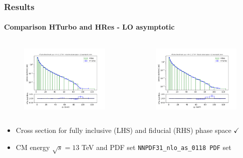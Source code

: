 \documentclass[aspectratio=43]{beamer}
\begin{document}
\begin{frame}
	
	\frametitle{Results}
	\framesubtitle{Comparison HTurbo and HRes - LO asymptotic}
	
	\footnotesize
	
	\begin{columns}
		
		
		\begin{figure}
			\includegraphics[width = 7cm]{plots/part3/chapter6/nlo-ct-1.png}
		\end{figure}
		
		
		\begin{figure}
			\includegraphics[width = 7cm]{plots/part3/chapter6/nlo-ct-fid-1.png}
		\end{figure}
		
	\end{columns}
	
	\begin{itemize}
		\item Cross section for fully inclusive (LHS) and fiducial (RHS) phase space {\color{darkgreen}$\checkmark$} 
		\item CM energy $\sqrt s = 13$ TeV and PDF set \texttt{NNPDF31\_nlo\_as\_0118 PDF} set
	\end{itemize}

\end{frame}
\end{document}
